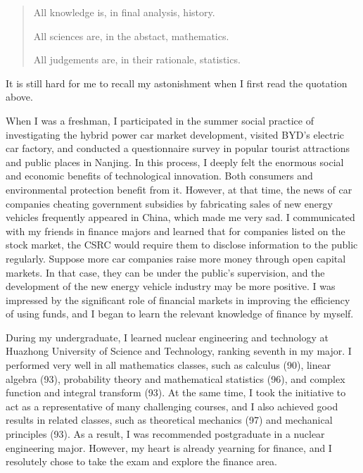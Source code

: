 \begin{quote}
All knowledge is, in final analysis, history.

All sciences are, in the abstact, mathematics.

All judgements are, in their rationale, statistics.

\end{quote}


It is still hard for me to recall my astonishment when I first read the quotation above.

When I was a freshman, I participated in the summer social practice of investigating the hybrid
power car market development, visited BYD's electric car factory, and conducted a
questionnaire survey in popular tourist attractions and public places in Nanjing. In this process,
I deeply felt the enormous social and economic benefits of technological innovation. Both
consumers and environmental protection benefit from it. However, at that time, the news of car
companies cheating government subsidies by fabricating sales of new energy vehicles
frequently appeared in China, which made me very sad. I communicated with my friends in
finance majors and learned that for companies listed on the stock market, the CSRC would
require them to disclose information to the public regularly. Suppose more car companies raise
more money through open capital markets. In that case, they can be under the public's
supervision, and the development of the new energy vehicle industry may be more positive. I
was impressed by the significant role of financial markets in improving the efficiency of using
funds, and I began to learn the relevant knowledge of finance by myself.

During my undergraduate, I learned nuclear engineering and technology at Huazhong
University of Science and Technology, ranking seventh in my major. I performed very well in
all mathematics classes, such as calculus (90), linear algebra (93), probability theory and
mathematical statistics (96), and complex function and integral transform (93). At the same
time, I took the initiative to act as a representative of many challenging courses, and I also
achieved good results in related classes, such as theoretical mechanics (97) and mechanical
principles (93). As a result, I was recommended postgraduate in a nuclear engineering major.
However, my heart is already yearning for finance, and I resolutely chose to take the exam and
explore the finance area.

